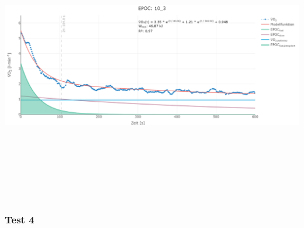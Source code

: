 \documentclass[
  letterpaper,
  DIV=11]{scrartcl}
\begin{document}
\includegraphics[width=11.45833in,height=4.6875in]{images/10_3.png}

\subsubsection{Test 4}
\end{document}
